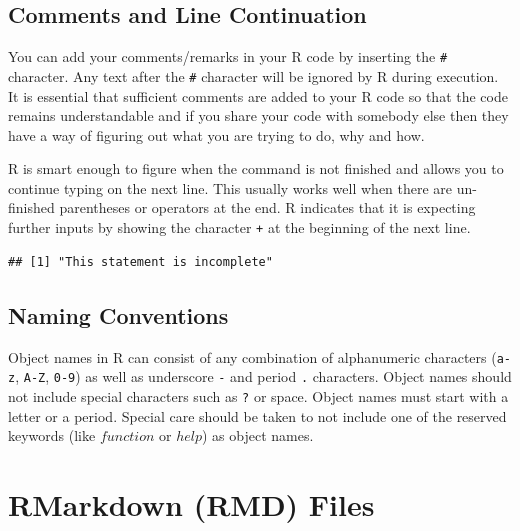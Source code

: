 \documentclass[10pt, letterpaper, twoside]{memoir}\usepackage{knitr}
\begin{document}
\subsection{Comments and Line Continuation}

You can add your comments/remarks in your R code by inserting the \verb|#| character. Any text after the \verb|#| character will be ignored by R during execution. It is essential that sufficient comments are added to your R code so that the code remains understandable and if you share your code with somebody else then they have a way of figuring out what you are trying to do, why and how.

R is smart enough to figure when the command is not finished and allows you to continue typing on the next line. This usually works well when there are un-finished parentheses or operators at the end. R indicates that it is expecting further inputs by showing the character \texttt{+} at the beginning of the next line. 

\begin{knitrout}
\color{fgcolor}\begin{kframe}
\begin{alltt}
\hlstd{(}\hlstd{)}  
\end{alltt}
\begin{verbatim}
## [1] "This statement is incomplete"
\end{verbatim}
\end{kframe}
\end{knitrout}

\subsection{Naming Conventions}

Object names in R can consist of any combination of alphanumeric characters (\texttt{a-z}, \texttt{A-Z}, \texttt{0-9}) as well as underscore \texttt{-} and period \texttt{.} characters. Object names should not include special characters such as \texttt{?} or space. Object names must start with a letter or a period. Special care should be taken to not include one of the reserved keywords (like $function$ or $help$) as object names.


\section{RMarkdown (RMD) Files}
\end{document}
